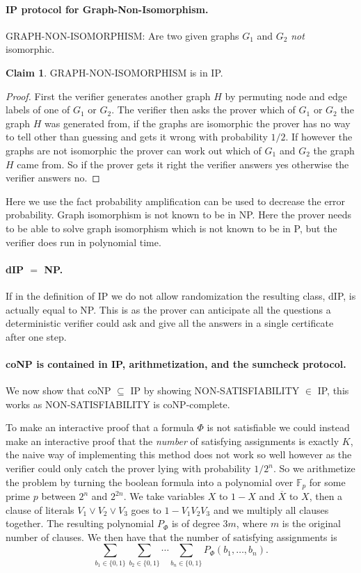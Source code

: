 \documentclass[11pt,a4paper]{article}
\theoremstyle{definition}
\newtheorem{claim}{Claim}
\newcommand{\FF}{\mathbb{F}}
\begin{document}
\paragraph{IP protocol for Graph-Non-Isomorphism.}
GRAPH-NON-ISOMORPHISM: Are two given graphs $G_1$ and $G_2$ \emph{not} isomorphic.

\begin{claim}
GRAPH-NON-ISOMORPHISM is in IP.
\end{claim}
\begin{proof}
First the verifier generates another graph $H$ by permuting node and edge labels of one of $G_1$ or $G_2$.
The verifier then asks the prover which of $G_1$ or $G_2$ the graph $H$ was generated from, if the graphs are isomorphic the prover has no way to tell other than guessing and gets it wrong with probability $1/2$.
If however the graphs are not isomorphic the prover can work out which of $G_1$ and $G_2$ the graph $H$ came from.
So if the prover gets it right the verifier answers yes otherwise the verifier answers no.
\end{proof}
Here we use the fact probability amplification can be used to decrease the error probability.
Graph isomorphism is not known to be in NP.
Here the prover needs to be able to solve graph isomorphism which is not known to be in P, but the verifier does run in polynomial time.

\paragraph{dIP $=$ NP.}
If in the definition of IP we do not allow randomization the resulting class, dIP, is actually equal to NP.
This is as the prover can anticipate all the questions a deterministic verifier could ask and give all the answers in a single certificate after one step.

\paragraph{coNP is contained in IP, arithmetization, and the sumcheck protocol.}
We now show that coNP $\subseteq$ IP by showing NON-SATISFIABILITY $\in$ IP, this works as NON-SATISFIABILITY is coNP-complete.

To make an interactive proof that a formula $\Phi$ is not satisfiable we could instead make an interactive proof that the \emph{number} of satisfying assignments is exactly $K$, the naive way of implementing this method does not work so well however as the verifier could only catch the prover lying with probability $1/2^n$.
So we arithmetize the problem by turning the boolean formula into a polynomial over $\FF_p$ for some prime $p$ between $2^n$ and $2^{2n}$.
We take variables $X$ to $1-X$ and $\overline{X}$ to $X$, then a clause of literals $V_1 \vee V_2 \vee V_3$ goes to $1 - V_1 V_2 V_3$ and we multiply all clauses together.
The resulting polynomial $P_\Phi$ is of degree $3m$, where $m$ is the original number of clauses.
We then have that the number of satisfying assignments is
\[
\sum_{b_1\in\{0,1\}} \sum_{b_2\in\{0,1\}} \cdots \sum_{b_n\in\{0,1\}} P_{\Phi}(b_1,\ldots,b_n).
\]
\end{document}
